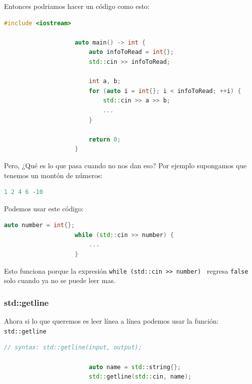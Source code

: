 \documentclass[12pt, fleqn]{report}                             %
\theoremstyle{break}                                            %
\newcommand{\textCode}[1]  { \texttt{#1} }                      %
\begin{document}
                Entonces podriamos hacer un código como esto:
                \begin{lstlisting}[language=C++, gobble=20]
                    #include <iostream>

                    auto main() -> int {
                        auto infoToRead = int{};
                        std::cin >> infoToRead;

                        int a, b;
                        for (auto i = int{}; i < infoToRead; ++i) {
                            std::cin >> a >> b;
                            ...
                        }

                        return 0;
                    }
                \end{lstlisting}

                Pero, ¿Qué es lo que pasa cuando no nos dan eso?
                Por ejemplo supongamos que tenemos un montón de números:
                \begin{lstlisting}[language=C++, gobble=20]
                    1 2 4 6 -10
                \end{lstlisting}

                Podemos usar este código:
                \begin{lstlisting}[language=C++, gobble=20]
                    auto number = int{};
                    while (std::cin >> number) {
                        ...
                    }
                \end{lstlisting}

                Esto funciona porque la expresión \textCode{while (std::cin >\/> \; number) } 
                regresa \textCode{false} solo cuando ya no se puede leer mas.


                \subsubsection{std::getline}

                    Ahora si lo que queremos es leer línea a línea
                    podemos usar la función: \textCode{std::getline}
                    \begin{lstlisting}[language=C++, gobble=24]
                        // syntax: std::getline(input, output);

                        auto name = std::string{};
                        std::getline(std::cin, name);
                    \end{lstlisting}
\end{document}

